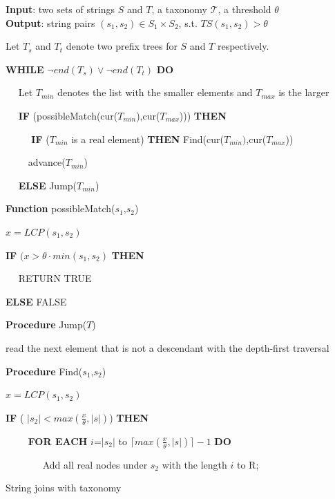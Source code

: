 \begin{algorithm}
{\bf Input}: two sets of strings $S$ and $T$, a taxonomy $\mathcal{T}$, a threshold $\theta$ \\
{\bf Output}: string pairs $(s_1,s_2) \in S_1 \times S_2$, s.t. $TS(s_1, s_2) > \theta$
\begin{compactenum}[(1)]
\item Let $T_s$ and $T_t$ denote two prefix trees for $S$ and $T$ respectively.
\item {\bf WHILE} $\neg end(T_s) \vee \neg end(T_t)$ {\bf DO}
\item ~~ Let $T_{min}$ denotes the list with the smaller elements and $T_{max}$ is the larger
\item  ~~ {\bf IF} (possibleMatch(cur($T_{min}$),cur($T_{max}$))) {\bf THEN}
\item ~~ ~~ {\bf  IF} ($T_{min}$ is a real element)   {\bf THEN} Find(cur($T_{min})$,cur($T_{max}$))
 \item ~~~~ advance($T_{min}$)
 \item ~~ {\bf ELSE} Jump($T_{min}$)
\end{compactenum}
\smallskip
\textbf{Function} possibleMatch($s_1$,$s_2$)
\begin{compactenum}[(1)]
\item  $x = LCP(s_1,s_2)$
\item {\bf IF}  $(x > \theta \cdot min (s_1, s_2 )$  {\bf THEN}
\item  ~~ RETURN TRUE
\item   {\bf ELSE} FALSE
\end{compactenum}
\smallskip
\textbf{Procedure} Jump($T$)
\begin{compactenum}[(1)]
\item  read the next element that is not a descendant with the depth-first traversal
\end{compactenum}
\smallskip
\textbf{Procedure} Find($s_1$,$s_2$)
\begin{compactenum}[(1)]
\item  $x = LCP(s_1,s_2) $
\item {\bf IF} ( $|s_2| < max(\frac{x}{\theta},|s|)$) {\bf THEN}
\item ~~~~ {\bf FOR EACH} $i$=$|s_2|$ to $ \lceil max(\frac{x}{\theta},|s|) \rceil -1 $ {\bf DO}
\item ~~~~~~~ Add all real nodes under $s_2$ with the length $i$ to R;
\end{compactenum}
\caption{String joins with taxonomy}
\label{alg:exactjoin}
\end{algorithm}


